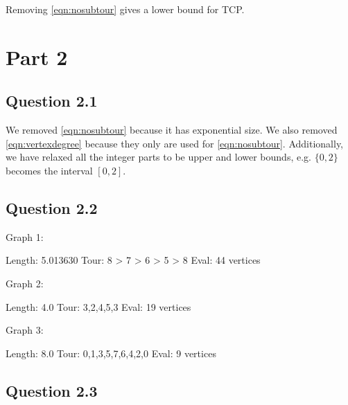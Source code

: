 \documentclass{sig-alternate}
\begin{document}
Removing \autoref{eqn:nosubtour} gives a lower bound for TCP.

\section*{Part 2}
\subsection*{Question 2.1}

We removed \autoref{eqn:nosubtour} because it has exponential size. We
also removed \autoref{eqn:vertexdegree} because they only are used for
\autoref{eqn:nosubtour}. Additionally, we have relaxed all the integer parts
to be upper and lower bounds, e.g. $\{0,2\}$ becomes the interval $[0,2]$.

\subsection*{Question 2.2}

Graph 1:

Length: 5.013630
Tour: 8 > 7 > 6 > 5 > 8
Eval: 44 vertices

Graph 2:

Length: 4.0
Tour: 3,2,4,5,3
Eval: 19 vertices

Graph 3:

Length: 8.0
Tour: 0,1,3,5,7,6,4,2,0
Eval: 9 vertices

\subsection*{Question 2.3}

\end{document}
